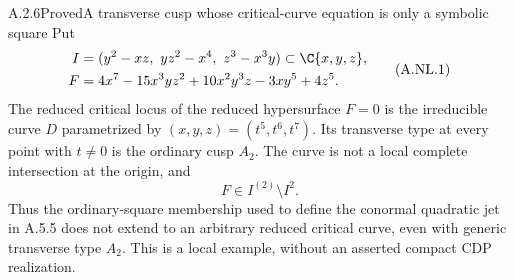 \begin{statement}{A.2.6}{Proved}{A transverse cusp whose critical-curve equation is only a symbolic square}
Put
\[
 \begin{aligned}
 I&=(y^2-xz,\ yz^2-x^4,\ z^3-x^3y)\subset\C\{x,y,z\},\\
 F&=4x^7-15x^3yz^2+10x^2y^3z-3xy^5+4z^5.
 \end{aligned}                                                   \tag{A.NL.1}
\]
The reduced critical locus of the reduced hypersurface $F=0$ is the
irreducible curve $D$ parametrized by $(x,y,z)=(t^5,t^6,t^7)$.
Its transverse type at every point with $t\ne0$ is the ordinary cusp
$A_2$. The curve is not a local complete intersection at the origin,
and
\[
             F\in I^{(2)}\setminus I^2.                         \tag{A.NL.2}
\]
Thus the ordinary-square membership used to define the conormal
quadratic jet in A.5.5 does not extend to an arbitrary reduced
critical curve, even with generic transverse type $A_2$.
This is a local example, without an asserted compact CDP realization.
\end{statement}

